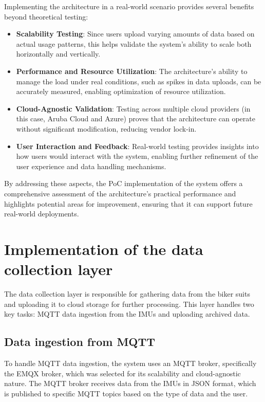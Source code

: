 Implementing the architecture in a real-world scenario provides several benefits beyond theoretical testing:
\begin{itemize}
    \item \textbf{Scalability Testing}: Since users upload varying amounts of data based on actual usage patterns, this helps validate the system’s ability to scale both horizontally and vertically.
    \item \textbf{Performance and Resource Utilization}: The architecture’s ability to manage the load under real conditions, such as spikes in data uploads, can be accurately measured, enabling optimization of resource utilization.
    \item \textbf{Cloud-Agnostic Validation}: Testing across multiple cloud providers (in this case, Aruba Cloud and Azure) proves that the architecture can operate without significant modification, reducing vendor lock-in.
    \item \textbf{User Interaction and Feedback}: Real-world testing provides insights into how users would interact with the system, enabling further refinement of the user experience and data handling mechanisms.
\end{itemize}

By addressing these aspects, the PoC implementation of the system offers a comprehensive assessment of the architecture’s practical performance and highlights potential areas for improvement, ensuring that it can support future real-world deployments.

\section{Implementation of the data collection layer}
\label{sec:implementation_data_collection}

The data collection layer is responsible for gathering data from the biker suits and uploading it to cloud storage for further processing. This layer handles two key tasks: MQTT data ingestion from the IMUs and uploading archived data.

\subsection{Data ingestion from MQTT}
To handle MQTT data ingestion, the system uses an MQTT broker, specifically the EMQX broker, which was selected for its scalability and cloud-agnostic nature. The MQTT broker receives data from the IMUs in JSON format, which is published to specific MQTT topics based on the type of data and the user.

